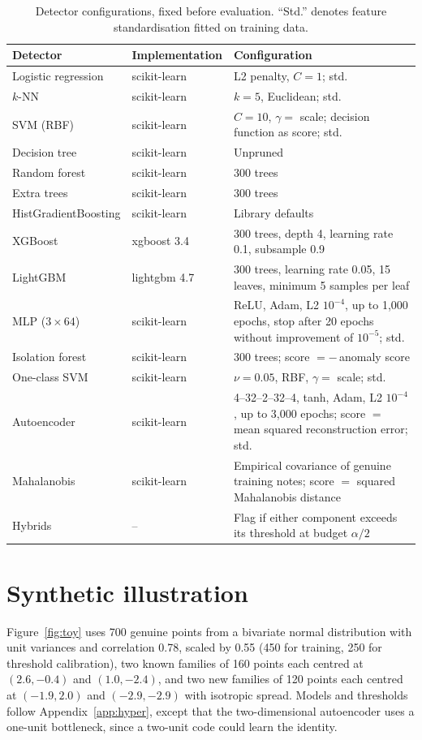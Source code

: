 \documentclass{article}
\theoremstyle{definition}
\theoremstyle{remark}
\begin{document}
\begin{table}[H]
\centering
\small
\caption{Detector configurations, fixed before evaluation. ``Std.'' denotes feature standardisation fitted on training data.}
\label{tab:hyper}
\begin{tabularx}{\textwidth}{@{}l l X@{}}
\toprule
Detector & Implementation & Configuration \\
\midrule
Logistic regression & scikit-learn & L2 penalty, $C=1$; std. \\
$k$-NN & scikit-learn & $k=5$, Euclidean; std. \\
SVM (RBF) & scikit-learn & $C=10$, $\gamma=$ scale; decision function as score; std. \\
Decision tree & scikit-learn & Unpruned \\
Random forest & scikit-learn & 300 trees \\
Extra trees & scikit-learn & 300 trees \\
HistGradientBoosting & scikit-learn & Library defaults \\
XGBoost & xgboost 3.4 & 300 trees, depth 4, learning rate 0.1, subsample 0.9 \\
LightGBM & lightgbm 4.7 & 300 trees, learning rate 0.05, 15 leaves, minimum 5 samples per leaf \\
MLP ($3\times64$) & scikit-learn & ReLU, Adam, L2 $10^{-4}$, up to 1,000 epochs, stop after 20 epochs without improvement of $10^{-5}$; std. \\
Isolation forest & scikit-learn & 300 trees; score $=-$\,anomaly score \\
One-class SVM & scikit-learn & $\nu=0.05$, RBF, $\gamma=$ scale; std. \\
Autoencoder & scikit-learn & 4--32--2--32--4, tanh, Adam, L2 $10^{-4}$, up to 3,000 epochs; score $=$ mean squared reconstruction error; std. \\
Mahalanobis & scikit-learn & Empirical covariance of genuine training notes; score $=$ squared Mahalanobis distance \\
Hybrids & -- & Flag if either component exceeds its threshold at budget $\alpha/2$ \\
\bottomrule
\end{tabularx}
\end{table}

\section{Synthetic illustration}
\label{app:toy}
Figure~\ref{fig:toy} uses 700 genuine points from a bivariate normal distribution with unit variances and correlation 0.78, scaled by 0.55 (450 for training, 250 for threshold calibration), two known families of 160 points each centred at $(2.6,-0.4)$ and $(1.0,-2.4)$, and two new families of 120 points each centred at $(-1.9,2.0)$ and $(-2.9,-2.9)$ with isotropic spread. Models and thresholds follow Appendix~\ref{app:hyper}, except that the two-dimensional autoencoder uses a one-unit bottleneck, since a two-unit code could learn the identity.
\end{document}
